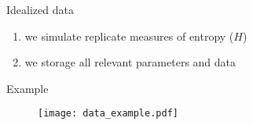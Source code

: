 %
%
\begin{lhframe}[rhgraphic={\texttt{[image: sim\_code4.png]}}]
	{Idealized data}
	
	\begin{enumerate}
		\item we simulate replicate measures of entropy ($H$)
		\item we storage all relevant parameters and data
	\end{enumerate}
\end{lhframe}
%
%
\begin{frame}
	{Example}
	\begin{figure}
		\texttt{[image: data\_example.pdf]}
	\end{figure}
\end{frame}
%
%